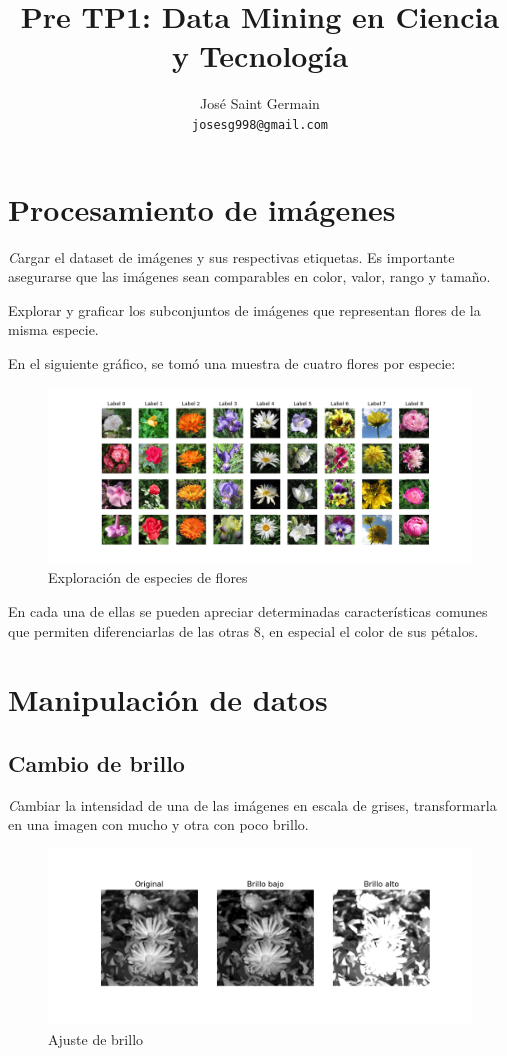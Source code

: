 \documentclass{article}
\title{Pre TP1: Data Mining en Ciencia y Tecnología}
\author{%
  José Saint Germain\\
  \texttt{josesg998@gmail.com} \\
}
\begin{document}
\maketitle

\section{Procesamiento de imágenes}

{\emph Cargar el dataset de imágenes y sus respectivas etiquetas. Es importante asegurarse que las 
imágenes sean comparables en color, valor, rango y tamaño.

Explorar y graficar los subconjuntos de imágenes que representan flores de la misma
especie.}

En el siguiente gráfico, se tomó una muestra de cuatro flores por especie:

\begin{figure}[h!]
  \centering  
  \includegraphics[width=1\textwidth]{1_ejemplos_flores.png}
  \caption{Exploración de especies de flores}
\end{figure}

En cada una de ellas se pueden apreciar determinadas características comunes que permiten diferenciarlas de las otras 8, en especial el color de sus pétalos.

\section{Manipulación de datos}

\subsection{Cambio de brillo}

{\emph Cambiar la intensidad de una de las imágenes en escala de grises, transformarla en una imagen con mucho y otra con poco brillo.}

\begin{figure}[h!]
  \centering    
  \includegraphics[width=.75\textwidth]{2_brillo.png}
  \caption{Ajuste de brillo}
\end{figure}
\pagebreak
\end{document}
